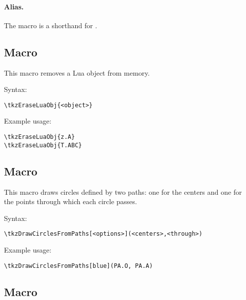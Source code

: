 \paragraph{Alias.} The macro  is a shorthand for .

\subsection{Macro }
\label{sub:macro_tkzEraseLuaObj}

This macro removes a Lua object from memory.

\medskip
\noindent
Syntax:

\begin{verbatim}
\tkzEraseLuaObj{<object>}
\end{verbatim}

\noindent
Example usage:

\begin{mybox}
\begin{verbatim}
\tkzEraseLuaObj{z.A}
\tkzEraseLuaObj{T.ABC}
\end{verbatim}
\end{mybox}

\subsection{Macro }

This macro draws circles defined by two paths: one for the centers and one for the points through which each circle passes.

\medskip
\noindent
Syntax:

\begin{verbatim}
\tkzDrawCirclesFromPaths[<options>](<centers>,<through>)
\end{verbatim}

\noindent
Example usage:

\begin{mybox}
\begin{verbatim}
\tkzDrawCirclesFromPaths[blue](PA.O, PA.A)
\end{verbatim}
\end{mybox}

\subsection{Macro }
\label{sub:macro_tkzDrawSegmentsFromPaths}

